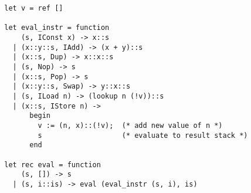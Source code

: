 \documentclass[11pt]{article}
\begin{document}
\begin{enumerate}
\begin{Verbatim}
        let v = ref []

        let eval_instr = function
            (s, IConst x) -> x::s
          | (x::y::s, IAdd) -> (x + y)::s
          | (x::s, Dup) -> x::x::s
          | (s, Nop) -> s
          | (x::s, Pop) -> s
          | (x::y::s, Swap) -> y::x::s
          | (s, ILoad n) -> (lookup n (!v))::s
          | (x::s, IStore n) ->
              begin
                v := (n, x)::(!v);  (* add new value of n *)
                s                   (* evaluate to result stack *)
              end

        let rec eval = function
            (s, []) -> s
          | (s, i::is) -> eval (eval_instr (s, i), is)
          \end{Verbatim}

  \end{enumerate}
\end{document}
